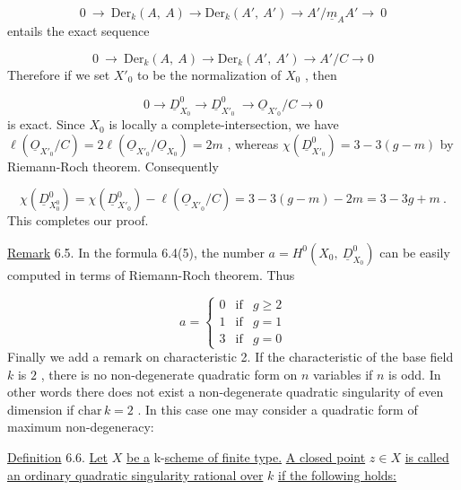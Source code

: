 \begin{equation*}
0 \ \rightarrow\ \mathrm{Der}_k(A,\ A) \rightarrow \mathrm{Der}_k(A',\ A') \rightarrow A'/\underline{m}_A A' \rightarrow\ 0
\end{equation*}
entails the exact sequence

\begin{equation*}
0 \ \rightarrow\ \mathrm{Der}_k(A,\ A) \rightarrow \mathrm{Der}_k(A',\ A') \rightarrow A'/C \rightarrow 0
\end{equation*}
Therefore if we set  $X'_0$  to be the normalization of  $X_0$ , then

\begin{equation*}
0 \rightarrow \underline{D}^0_{X_0} \rightarrow \underline{D}^0_{X'_0}\ \rightarrow \underline{O}_{X'_0}/C \rightarrow 0
\end{equation*}
is exact. Since  $X_0$  is locally a complete-intersection, we have  $\ell(\underline{O}_{X'_0}/C) = 2\ell(\underline{O}_{X'_0}/\underline{O}_{X_0}) = 2m$ , whereas  $\chi(\underline{D}^0_{X'_0}) = 3 - 3(g-m)$  by Riemann-Roch theorem. Consequently

\begin{equation*}
\chi(\underline{D}^0_{X^0_0}) = \chi(\underline{D}^0_{X'_0}) - \ell(\underline{O}_{X'_0}/C) = 3 - 3(g-m) - 2m = 3 - 3g + m \ .
\end{equation*}
This completes our proof.

\underline{Remark} 6.5.  In the formula 6.4(5), the number  $a = H^0(X_0,\ \underline{D}^0_{X_0})$  can be easily computed in terms of Riemann-Roch theorem. Thus

\begin{equation*}
a = \left\{ \begin{array}{lll} 0 & \text{if} & g \geq 2 \\[4pt] 1 & \text{if} & g = 1 \\[4pt] 3 & \text{if} & g = 0 \end{array} \right.
\end{equation*}
Finally we add a remark on characteristic 2. If the characteristic of the base field  $k$  is  $2$ , there is no non-degenerate quadratic form on  $n$  variables if  $n$  is odd. In other words there does not exist a non-degenerate quadratic singularity of even dimension if  $\mathrm{char}\, k = 2$ . In this case one may consider a quadratic form of maximum non-degeneracy: 



\underline{Definition} 6.6.  \underline{Let}  $X$  \underline{be a} k-\underline{scheme of finite type.} \underline{A closed point}  $z \in X$  \underline{is called an ordinary quadratic singularity rational over}  $k$  \underline{if the following holds:}

